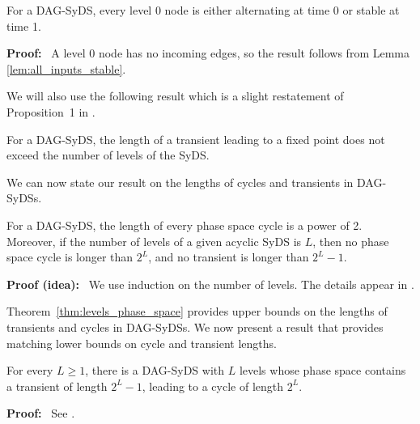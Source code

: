 \begin{lemma}\label{lem:level_zero_nodes}
For a DAG-SyDS, every level 0 node is either
alternating at time 0 or stable at time 1.
\end{lemma}
\noindent
\textbf{Proof:}~
 A level 0 node has no incoming edges,
so the result follows from Lemma \ref{lem:all_inputs_stable}.  \QED

We will also use the following result which is a slight restatement
of Proposition~1 in \cite{Chistikov-etal-2020}.


\begin{proposition}\label{pro:transient_fixed_point}
For a DAG-SyDS,
the length of a transient leading to a fixed point does not
exceed the number of levels of the SyDS.
\end{proposition}

We can now state our result on the lengths of cycles and
transients in DAG-SyDSs.

\begin{theorem}\label{thm:levels_phase_space}
For a DAG-SyDS,
the length of every phase space cycle is a power of 2.
Moreover, if the number of levels of a given acyclic SyDS is $L$,
then no phase space cycle is longer than $2^L$,
and no transient is longer than $2^L-1$.
\end{theorem}

\noindent
\textbf{Proof (idea):}~ We use induction on the number of levels.
The details appear in \cite{Rosenkrantz-etal-2020}.

Theorem~\ref{thm:levels_phase_space} provides upper bounds
on the lengths of transients and cycles in DAG-SyDSs.
We now present a result that provides matching
lower bounds on cycle and transient lengths.

\begin{theorem}\label{thm:path_length_lower_bounds}
For every $L  \geq 1$, there is a DAG-SyDS with $L$ levels
whose phase space contains a transient of length $2^L-1$,
leading to a cycle of length $2^L$.
\end{theorem}

\noindent
\textbf{Proof:}~ See \cite{Rosenkrantz-etal-2020}.
